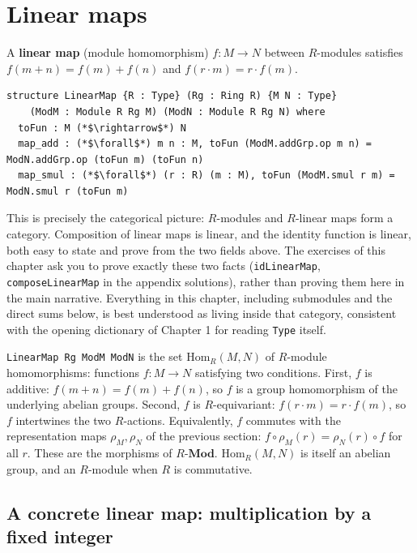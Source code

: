 \section{Linear maps}\label{sec:10-modules:05-linear-maps:1}

A \textbf{linear map} (module homomorphism) \(f : M \to N\) between \(R\)-modules satisfies \(f(m+n) = f(m) + f(n)\) and \(f(r \cdot m) = r \cdot f(m)\).

\begin{lstlisting}
structure LinearMap {R : Type} (Rg : Ring R) {M N : Type}
    (ModM : Module R Rg M) (ModN : Module R Rg N) where
  toFun : M (*$\rightarrow$*) N
  map_add : (*$\forall$*) m n : M, toFun (ModM.addGrp.op m n) = ModN.addGrp.op (toFun m) (toFun n)
  map_smul : (*$\forall$*) (r : R) (m : M), toFun (ModM.smul r m) = ModN.smul r (toFun m)
\end{lstlisting}

This is precisely the categorical picture: \(R\)-modules and \(R\)-linear maps form a category. Composition of linear maps is linear, and the identity function is linear, both easy to state and prove from the two fields above. The exercises of this chapter ask you to prove exactly these two facts (\texttt{idLinearMap}, \texttt{composeLinearMap} in the appendix solutions), rather than proving them here in the main narrative. Everything in this chapter, including submodules and the direct sums below, is best understood as living inside that category, consistent with the opening dictionary of Chapter 1 for reading \texttt{Type} itself.

\begin{mathreading}

\texttt{LinearMap Rg ModM ModN} is the set \(\mathrm{Hom}_R(M, N)\) of \(R\)-module homomorphisms: functions \(f : M \to N\) satisfying two conditions. First, \(f\) is additive: \(f(m+n) = f(m)+f(n)\), so \(f\) is a group homomorphism of the underlying abelian groups. Second, \(f\) is \(R\)-equivariant: \(f(r\cdot m) = r\cdot f(m)\), so \(f\) intertwines the two \(R\)-actions. Equivalently, \(f\) commutes with the representation maps \(\rho_M, \rho_N\) of the previous section: \(f\circ\rho_M(r) = \rho_N(r)\circ f\) for all \(r\). These are the morphisms of \(R\text{-}\mathbf{Mod}\). \(\mathrm{Hom}_R(M,N)\) is itself an abelian group, and an \(R\)-module when \(R\) is commutative.

\end{mathreading}

\subsection{A concrete linear map: multiplication by a fixed integer}\label{sec:10-modules:05-linear-maps:2}

